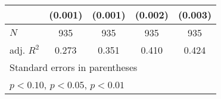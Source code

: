 {\begin{tabular}{l*{4}{c}}
            &     (0.001)         &     (0.001)         &     (0.002)         &     (0.003)         \\
\hline
\(N\)       &         935         &         935         &         935         &         935         \\
adj. \(R^{2}\)&       0.273         &       0.351         &       0.410         &       0.424         \\
\hline\hline
\multicolumn{5}{l}{\footnotesize Standard errors in parentheses}\\
\multicolumn{5}{l}{\footnotesize \sym{*} \(p<0.10\), \sym{**} \(p<0.05\), \sym{***} \(p<0.01\)}\\
\end{tabular}
}

